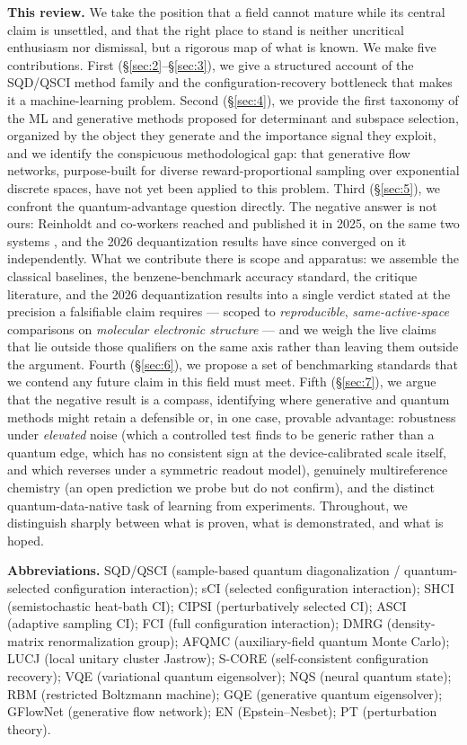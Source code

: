 \documentclass[onecolumn,a4paper]{quantumarticle}
\begin{document}
\textbf{This review.} We take the position that a field cannot mature while its central claim is unsettled, and that the right place to stand is neither uncritical enthusiasm nor dismissal, but a rigorous map of what is known. We make five contributions. First (\S\ref{sec:2}--\S\ref{sec:3}), we give a structured account of the SQD/QSCI method family and the configuration-recovery bottleneck that makes it a machine-learning problem. Second (\S\ref{sec:4}), we provide the first taxonomy of the ML and generative methods proposed for determinant and subspace selection, organized by the object they generate and the importance signal they exploit, and we identify the conspicuous methodological gap: that generative flow networks, purpose-built for diverse reward-proportional sampling over exponential discrete spaces, have not yet been applied to this problem. Third (\S\ref{sec:5}), we confront the quantum-advantage question directly. The negative answer is not ours: Reinholdt and co-workers reached and published it in 2025, on the same two systems \cite{reinholdt2025}, and the 2026 dequantization results have since converged on it independently. What we contribute there is scope and apparatus: we assemble the classical baselines, the benzene-benchmark accuracy standard, the critique literature, and the 2026 dequantization results into a single verdict stated at the precision a falsifiable claim requires --- scoped to \emph{reproducible}, \emph{same-active-space} comparisons on \emph{molecular electronic structure} --- and we weigh the live claims that lie outside those qualifiers \cite{kirby2026,weaving2025,kemmoku2026} on the same axis rather than leaving them outside the argument. Fourth (\S\ref{sec:6}), we propose a set of benchmarking standards that we contend any future claim in this field must meet. Fifth (\S\ref{sec:7}), we argue that the negative result is a compass, identifying where generative and quantum methods might retain a defensible or, in one case, provable advantage: robustness under \emph{elevated} noise (which a controlled test finds to be generic rather than a quantum edge, which has no consistent sign at the device-calibrated scale itself, and which reverses under a symmetric readout model), genuinely multireference chemistry (an open prediction we probe but do not confirm), and the distinct quantum-data-native task of learning from experiments. Throughout, we distinguish sharply between what is proven, what is demonstrated, and what is hoped.

\medskip\noindent\textbf{Abbreviations.} {\footnotesize SQD/QSCI (sample-based quantum diagonalization / quantum-selected configuration interaction); sCI (selected configuration interaction); SHCI (semistochastic heat-bath CI); CIPSI (perturbatively selected CI); ASCI (adaptive sampling CI); FCI (full configuration interaction); DMRG (density-matrix renormalization group); AFQMC (auxiliary-field quantum Monte Carlo); LUCJ (local unitary cluster Jastrow); S-CORE (self-consistent configuration recovery); VQE (variational quantum eigensolver); NQS (neural quantum state); RBM (restricted Boltzmann machine); GQE (generative quantum eigensolver); GFlowNet (generative flow network); EN (Epstein--Nesbet); PT (perturbation theory).}
\end{document}
